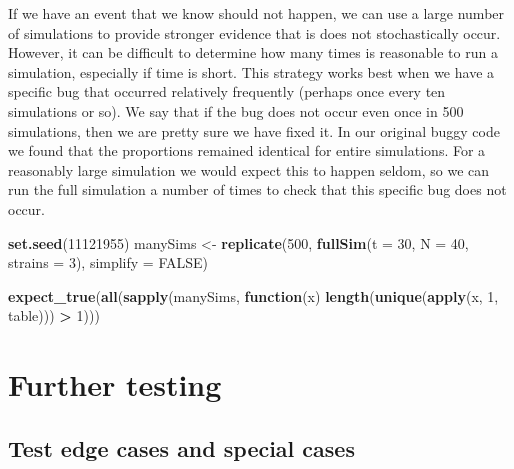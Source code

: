 \documentclass[10pt,letterpaper]{article}
\newenvironment{Shaded}{\begin{snugshade}}{\end{snugshade}}
\newcommand{\ControlFlowTok}[1]{\textcolor[rgb]{0.13,0.29,0.53}{\textbf{#1}}}
\newcommand{\DataTypeTok}[1]{\textcolor[rgb]{0.13,0.29,0.53}{#1}}
\newcommand{\DecValTok}[1]{\textcolor[rgb]{0.00,0.00,0.81}{#1}}
\newcommand{\KeywordTok}[1]{\textcolor[rgb]{0.13,0.29,0.53}{\textbf{#1}}}
\newcommand{\NormalTok}[1]{#1}
\newcommand{\OperatorTok}[1]{\textcolor[rgb]{0.81,0.36,0.00}{\textbf{#1}}}
\newcommand{\OtherTok}[1]{\textcolor[rgb]{0.56,0.35,0.01}{#1}}
\newcommand{\StringTok}[1]{\textcolor[rgb]{0.31,0.60,0.02}{#1}}
\begin{document}
If we have an event that we know should not happen, we can use a large number of simulations to provide stronger evidence that is does not stochastically occur.
However, it can be difficult to determine how many times is reasonable to run a simulation, especially if time is short.
This strategy works best when we have a specific bug that occurred relatively frequently (perhaps once every ten simulations or so).
We say that if the bug does not occur even once in 500 simulations, then we are pretty sure we have fixed it.
In our original buggy code we found that the proportions remained identical for entire simulations.
For a reasonably large simulation we would expect this to happen seldom, so we can run the full simulation a number of times to check that this specific bug does not occur.
\newline
{}\label{returningstrain}

\begin{Shaded}
\begin{Highlighting}[]
\KeywordTok{set.seed}\NormalTok{(}\DecValTok{11121955}\NormalTok{)}
\NormalTok{manySims <-}\StringTok{ }\KeywordTok{replicate}\NormalTok{(}\DecValTok{500}\NormalTok{, }\KeywordTok{fullSim}\NormalTok{(}\DataTypeTok{t =} \DecValTok{30}\NormalTok{, }\DataTypeTok{N =} \DecValTok{40}\NormalTok{, }\DataTypeTok{strains =} \DecValTok{3}\NormalTok{), }
                      \DataTypeTok{simplify =} \OtherTok{FALSE}\NormalTok{)}

\KeywordTok{expect_true}\NormalTok{(}\KeywordTok{all}\NormalTok{(}\KeywordTok{sapply}\NormalTok{(manySims, }
                       \ControlFlowTok{function}\NormalTok{(x) }
                         \KeywordTok{length}\NormalTok{(}\KeywordTok{unique}\NormalTok{(}\KeywordTok{apply}\NormalTok{(x, }\DecValTok{1}\NormalTok{, table))) }\OperatorTok{>}\StringTok{ }\DecValTok{1}\NormalTok{)))}
\end{Highlighting}
\end{Shaded}

\hypertarget{further-testing}{%
\section{Further testing}\label{further-testing}}

\hypertarget{corners}{%
\subsection*{Test edge cases and special cases}\label{corners}}
\end{document}

